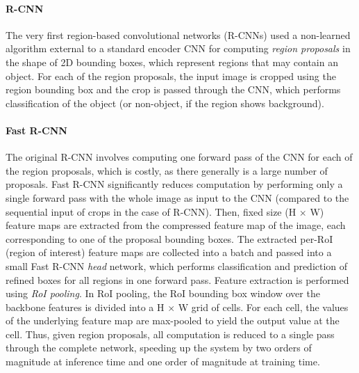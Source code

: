 \paragraph{R-CNN}
The very first region-based convolutional networks (R-CNNs) \cite{RCNN} used a non-learned algorithm external to a standard encoder CNN
for computing \emph{region proposals} in the shape of 2D bounding boxes, which represent regions that may contain an object.
For each of the region proposals, the input image is cropped using the region bounding box and the crop is
passed through the CNN, which performs classification of the object (or non-object, if the region shows background).

\paragraph{Fast R-CNN}
The original R-CNN involves computing one forward pass of the CNN for each of the region proposals,
which is costly, as there generally is a large number of proposals.
Fast R-CNN \cite{FastRCNN} significantly reduces computation by performing only a single forward pass with the whole image
as input to the CNN (compared to the sequential input of crops in the case of R-CNN).
Then, fixed size (H $\times$ W) feature maps are extracted from the compressed feature map of the image,
each corresponding to one of the proposal bounding boxes.
The extracted per-RoI (region of interest) feature maps are collected into a batch and passed into a small Fast R-CNN
\emph{head} network, which performs classification and prediction of refined boxes for all regions in one forward pass.
Feature extraction is performed using \emph{RoI pooling}. In RoI pooling, the RoI bounding box window over the backbone features
is divided into a H $\times$ W grid of cells. For each cell, the values of the underlying
feature map are max-pooled to yield the output value at the cell.
Thus, given region proposals, all computation is reduced to a single pass through the complete network,
speeding up the system by two orders of magnitude at inference time and one order of magnitude
at training time.


